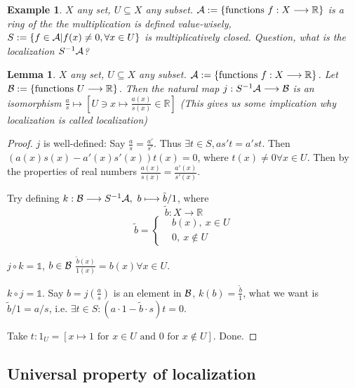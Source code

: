\documentclass[11pt]{article}
\newtheorem{lemma}[thm]{Lemma}
\newtheorem{ex}[thm]{Example}
\newcommand{\reals}{\mathbb R}
\newcommand{\cala}{{\cal A}}
\newcommand{\calb}{{\cal B}}
\newcommand{\lrta}{\longrightarrow}
\begin{document}
\begin{ex}
$X$ any set, $U\subseteq X$ any subset.
$\cala:=\{\text{functions } f:X\lrta \reals\}$ is a ring of the the multiplication is defined value-wisely, $S:=\{f\in \cala| f(x)\neq 0, \forall x\in U\}$ is multiplicatively closed. Question, what is the localization $S^{-1}\cala$?
\end{ex}
\begin{lemma}$X$ any set, $U\subseteq X$ any subset.
$\cala:=\{\text{functions } f:X\lrta \reals\}$.
Let $\calb:=\{\text{functions }U\lrta \reals\}$.
Then the natural map $j:S^{-1}\cala\lrta \calb$ is an isomorphism $\frac{a}{s}\mapsto [U\ni x\mapsto\frac{a(x)}{s(x)}\in\reals]$ (This gives us some implication why localization is called localization)
\end{lemma}
\begin{proof}
$j$ is well-defined:
Say $\frac{a}{s}=\frac{a'}{s'}$. Thus $\exists t\in S, a s' t=a' s t$. Then $(a(x)s(x)-a'(x)s'(x))t(x)=0$, where $t(x)\neq0\forall x\in U$. Then by the properties of real numbers $\frac{a(x)}{s(x)}=\frac{a'(x)}{s'(x)}$.

Try defining $k:\calb\lrta S^{-1}\cala,\ b\longmapsto \tilde{b}/1$, where
$$
\tilde{b}:X\lrta \reals
$$
$$
\tilde{b}=\left\{
\begin{aligned}
&b(x),\ x\in U\\
&0, \ x\notin U
\end{aligned}
\right.
$$

$j\circ k=\mathds{1}$, $b\in \calb$
$\frac{\tilde{b}(x)}{1(x)}=b(x)\forall x\in U$.

$k\circ j=\mathds{1}$. Say $b=j(\frac{a}{s})$ is an element in $\calb$, $k(b)=\frac{\tilde{b}}{1}$, what we want is $\tilde{b}/1=a/s$, i.e. $\exists t\in S:(a\cdot 1-\tilde{b}\cdot s)t=0$.

Take $t:1_U=[x\mapsto 1 \text{ for }x\in U \text{ and } 0 \text{ for } x\not \in U]$. Done.
\end{proof}

\subsection*{Universal property of localization}
\end{document}
